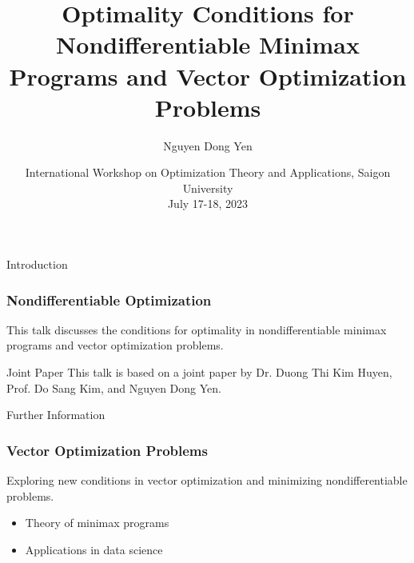 \documentclass{beamer}
\title[Optimality Conditions]{Optimality Conditions for Nondifferentiable Minimax Programs and Vector Optimization Problems}
\author[Nguyen Dong Yen]{Nguyen Dong Yen}
\institute{Institute of Mathematics, Vietnam Academy of Science and Technology}
\date[July 17th, 2023]{International Workshop on Optimization Theory and Applications, Saigon University \\ July 17-18, 2023}
\begin{document}
\begin{frame}
  \titlepage
\end{frame}

\begin{frame}{Introduction}
  \frametitle{Nondifferentiable Optimization}
  This talk discusses the conditions for optimality in nondifferentiable minimax programs and vector optimization problems.
  
  \begin{block}{Joint Paper}
    This talk is based on a joint paper by Dr. Duong Thi Kim Huyen, Prof. Do Sang Kim, and Nguyen Dong Yen.
  \end{block}
\end{frame}

\begin{frame}{Further Information}
  \frametitle{Vector Optimization Problems}
  Exploring new conditions in vector optimization and minimizing nondifferentiable problems.

  \begin{itemize}
    \item Theory of minimax programs
    \item Applications in data science
  \end{itemize}
\end{frame}
\end{document}
